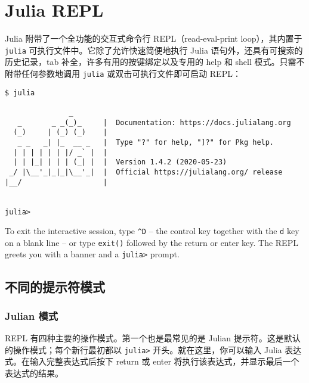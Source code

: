 \hypertarget{2176533558823998019}{}


\chapter{Julia REPL}



Julia 附带了一个全功能的交互式命令行 REPL（read-eval-print loop），其内置于 \texttt{julia} 可执行文件中。它除了允许快速简便地执行 Julia 语句外，还具有可搜索的历史记录，tab 补全，许多有用的按键绑定以及专用的 help 和 shell 模式。只需不附带任何参数地调用 \texttt{julia} 或双击可执行文件即可启动 REPL：




\begin{lstlisting}
$ julia

               _
   _       _ _(_)_     |  Documentation: https://docs.julialang.org
  (_)     | (_) (_)    |
   _ _   _| |_  __ _   |  Type "?" for help, "]?" for Pkg help.
  | | | | | | |/ _` |  |
  | | |_| | | | (_| |  |  Version 1.4.2 (2020-05-23)
 _/ |\__'_|_|_|\__'_|  |  Official https://julialang.org/ release
|__/                   |


julia>
\end{lstlisting}



To exit the interactive session, type \texttt{{\textasciicircum}D} – the control key together with the \texttt{d} key on a blank line – or type \texttt{exit()} followed by the return or enter key. The REPL greets you with a banner and a \texttt{julia>} prompt.



\hypertarget{13843805802306265376}{}


\section{不同的提示符模式}



\hypertarget{2631446594844418165}{}


\subsection{Julian 模式}



REPL 有四种主要的操作模式。第一个也是最常见的是 Julian 提示符。这是默认的操作模式；每个新行最初都以 \texttt{julia>} 开头。就在这里，你可以输入 Julia 表达式。在输入完整表达式后按下 return 或 enter 将执行该表达式，并显示最后一个表达式的结果。




